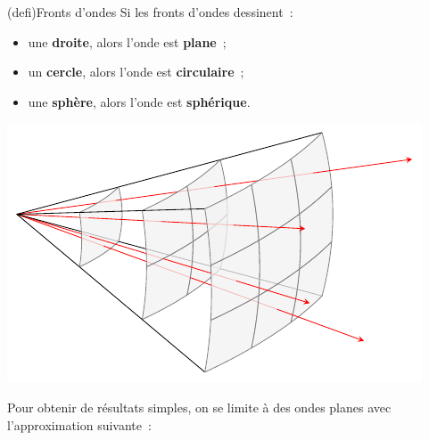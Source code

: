 \documentclass[../../main/main.tex]{subfiles}
\begin{document}
\begin{tcb}[sidebyside, righthand ratio=.5](defi){Fronts d'ondes}
	Si les fronts d'ondes dessinent~:
	\begin{itemize}
		\item une \textbf{droite}, alors l'onde est \textbf{plane}~;
		\item un \textbf{cercle}, alors l'onde est \textbf{circulaire}~;
		\item une \textbf{sphère}, alors l'onde est \textbf{sphérique}.
	\end{itemize}
	\tcblower
	\begin{center}
		\includegraphics[width=.65\linewidth]{wave_3d_sph}
	\end{center}
\end{tcb}

Pour obtenir de résultats simples, on se limite à des ondes planes avec
l'approximation suivante~:
\end{document}
